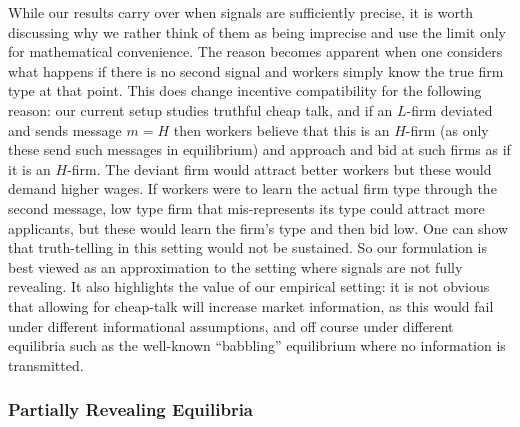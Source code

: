 \documentclass[12pt]{article}
\begin{document}
While our results carry over when signals are sufficiently precise, it is worth discussing why we rather think of them as being imprecise and use the limit only for mathematical convenience. The reason becomes apparent when one considers what happens if there is no second signal and workers simply know the true firm type at that point. This does change incentive compatibility for the following reason: our current setup studies truthful cheap talk, and if an $L$-firm deviated and sends message $m=H$ then workers believe that this is an $H$-firm (as only these send such messages in equilibrium) and approach and bid at such firms as if it is an $H$-firm. The deviant firm would attract better workers but these would demand higher wages. If workers were to learn the actual firm type through the second message, low type firm that
mis-represents its type could attract more applicants, but these would
learn the firm's type and then bid low. One can show that truth-telling in this
setting would not be sustained. So our formulation is best viewed as an
approximation to the setting where signals are not fully revealing. It also
highlights the value of our empirical setting: it is not obvious that
allowing for cheap-talk will increase market information, as this would fail
under different informational assumptions, and off course under different
equilibria such as the well-known ``babbling'' equilibrium where no
information is transmitted.





\subsubsection{Partially Revealing Equilibria}
\label{online_app:partially_revealing_eq}
\end{document}
